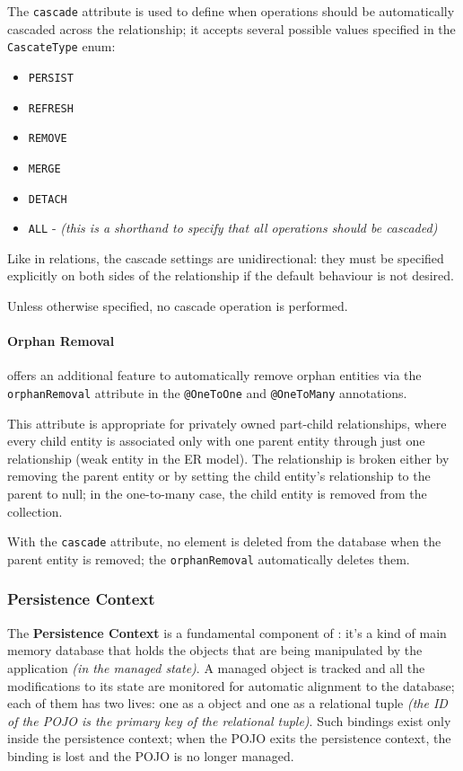 \documentclass[english]{article}
\begin{document}
The \texttt{cascade} attribute is used to define when operations should be automatically cascaded across the relationship;
it accepts several possible values specified in the \texttt{CascateType} enum:

\begin{itemize}[label=\textbf{\texttt{>}}]
  \item \texttt{PERSIST}
  \item \texttt{REFRESH}
  \item \texttt{REMOVE}
  \item \texttt{MERGE}
  \item \texttt{DETACH}
  \item \texttt{ALL} - \textit{(this is a shorthand to specify that all operations should be cascaded)}
\end{itemize}

Like in relations, the cascade settings are unidirectional: they must be specified explicitly on both sides of the relationship if the default behaviour is not desired.

Unless otherwise specified, no cascade operation is performed.

\paragraph{Orphan Removal}

\jpa offers an additional feature to automatically remove orphan entities via the \texttt{orphanRemoval} attribute in the \texttt{@OneToOne} and \texttt{@OneToMany} annotations.

This attribute is appropriate for privately owned part-child relationships, where every child entity is associated only with one parent entity through just one relationship (weak entity in the ER model).
The relationship is broken either by removing the parent entity or by setting the child entity's relationship to the parent to null;
in the one-to-many case, the child entity is removed from the collection.

With the \texttt{cascade} attribute, no element is deleted from the database when the parent entity is removed;
the \texttt{orphanRemoval} automatically deletes them.

\subsubsection{Persistence Context}

The \textbf{Persistence Context} is a fundamental component of \jpa:
it's a kind of main memory database that holds the objects that are being manipulated by the application \textit{(in the managed state)}.
A managed object is tracked and all the modifications to its state are monitored for automatic alignment to the database;
each of them has two lives: one as a \java object and one as a relational tuple \textit{(the ID of the POJO is the primary key of the relational tuple)}.
Such bindings exist only inside the persistence context;
when the POJO exits the persistence context, the binding is lost and the POJO is no longer managed.
\end{document}
